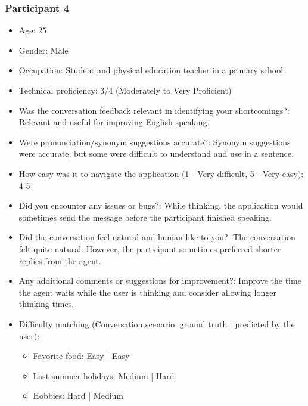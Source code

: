 \documentclass{article}
\begin{document}
\subsubsection{Participant 4}
\begin{itemize}
    \item Age: 25
    \item Gender: Male
    \item Occupation: Student and physical education teacher in a primary school
    \item Technical proficiency: 3/4 (Moderately to Very Proficient)
    \item Was the conversation feedback relevant in identifying your shortcomings?: Relevant and useful for improving English speaking.
    \item Were pronunciation/synonym suggestions accurate?: Synonym suggestions were accurate, but some were difficult to understand and use in a sentence.
    \item How easy was it to navigate the application (1 - Very difficult, 5 - Very easy): 4-5
    \item Did you encounter any issues or bugs?: While thinking, the application would sometimes send the message before the participant finished speaking.
    \item Did the conversation feel natural and human-like to you?: The conversation felt quite natural. However, the participant sometimes preferred shorter replies from the agent.
    \item Any additional comments or suggestions for improvement?: Improve the time the agent waits while the user is thinking and consider allowing longer thinking times.
    \item Difficulty matching (Conversation scenario: ground truth | predicted by the user):
    \begin{itemize}
        \item Favorite food: Easy | Easy
        \item Last summer holidays: Medium | Hard
        \item Hobbies: Hard | Medium
    \end{itemize}
\end{itemize}
\end{document}

